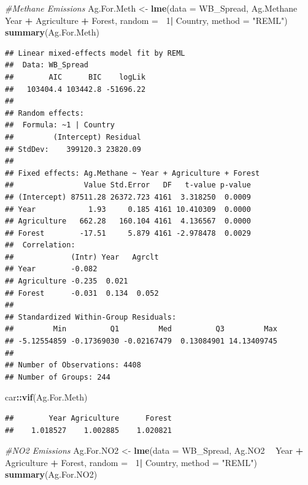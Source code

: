 \documentclass[12pt,]{article}
\newenvironment{Shaded}{\begin{snugshade}}{\end{snugshade}}
\newcommand{\KeywordTok}[1]{\textcolor[rgb]{0.13,0.29,0.53}{\textbf{#1}}}
\newcommand{\DataTypeTok}[1]{\textcolor[rgb]{0.13,0.29,0.53}{#1}}
\newcommand{\DecValTok}[1]{\textcolor[rgb]{0.00,0.00,0.81}{#1}}
\newcommand{\StringTok}[1]{\textcolor[rgb]{0.31,0.60,0.02}{#1}}
\newcommand{\CommentTok}[1]{\textcolor[rgb]{0.56,0.35,0.01}{\textit{#1}}}
\newcommand{\OperatorTok}[1]{\textcolor[rgb]{0.81,0.36,0.00}{\textbf{#1}}}
\newcommand{\NormalTok}[1]{#1}
\begin{document}
\begin{Shaded}
\begin{Highlighting}[]
\CommentTok{#Methane Emissions}
\NormalTok{Ag.For.Meth <-}\StringTok{ }\KeywordTok{lme}\NormalTok{(}\DataTypeTok{data =}\NormalTok{ WB_Spread,}
\NormalTok{                 Ag.Methane }\OperatorTok{~}\StringTok{ }\NormalTok{Year }\OperatorTok{+}\StringTok{ }\NormalTok{Agriculture }\OperatorTok{+}\StringTok{ }\NormalTok{Forest,}
                 \DataTypeTok{random =} \OperatorTok{~}\DecValTok{1}\OperatorTok{|}\StringTok{ }\NormalTok{Country,}
                 \DataTypeTok{method =} \StringTok{"REML"}\NormalTok{)}
\KeywordTok{summary}\NormalTok{(Ag.For.Meth)}
\end{Highlighting}
\end{Shaded}

\begin{verbatim}
## Linear mixed-effects model fit by REML
##  Data: WB_Spread 
##        AIC      BIC    logLik
##   103404.4 103442.8 -51696.22
## 
## Random effects:
##  Formula: ~1 | Country
##         (Intercept) Residual
## StdDev:    399120.3 23820.09
## 
## Fixed effects: Ag.Methane ~ Year + Agriculture + Forest 
##                Value Std.Error   DF   t-value p-value
## (Intercept) 87511.28 26372.723 4161  3.318250  0.0009
## Year            1.93     0.185 4161 10.410309  0.0000
## Agriculture   662.28   160.104 4161  4.136567  0.0000
## Forest        -17.51     5.879 4161 -2.978478  0.0029
##  Correlation: 
##             (Intr) Year   Agrclt
## Year        -0.082              
## Agriculture -0.235  0.021       
## Forest      -0.031  0.134  0.052
## 
## Standardized Within-Group Residuals:
##         Min          Q1         Med          Q3         Max 
## -5.12554859 -0.17369030 -0.02167479  0.13084901 14.13409745 
## 
## Number of Observations: 4408
## Number of Groups: 244
\end{verbatim}

\begin{Shaded}
\begin{Highlighting}[]
\NormalTok{car}\OperatorTok{::}\KeywordTok{vif}\NormalTok{(Ag.For.Meth)}
\end{Highlighting}
\end{Shaded}

\begin{verbatim}
##        Year Agriculture      Forest 
##    1.018527    1.002885    1.020821
\end{verbatim}

\begin{Shaded}
\begin{Highlighting}[]
\CommentTok{#NO2 Emissions}
\NormalTok{Ag.For.NO2 <-}\StringTok{ }\KeywordTok{lme}\NormalTok{(}\DataTypeTok{data =}\NormalTok{ WB_Spread,}
\NormalTok{                 Ag.NO2 }\OperatorTok{~}\StringTok{ }\NormalTok{Year }\OperatorTok{+}\StringTok{ }\NormalTok{Agriculture }\OperatorTok{+}\StringTok{ }\NormalTok{Forest,}
                 \DataTypeTok{random =} \OperatorTok{~}\DecValTok{1}\OperatorTok{|}\StringTok{ }\NormalTok{Country,}
                 \DataTypeTok{method =} \StringTok{"REML"}\NormalTok{)}
\KeywordTok{summary}\NormalTok{(Ag.For.NO2)}
\end{Highlighting}
\end{Shaded}
\end{document}

